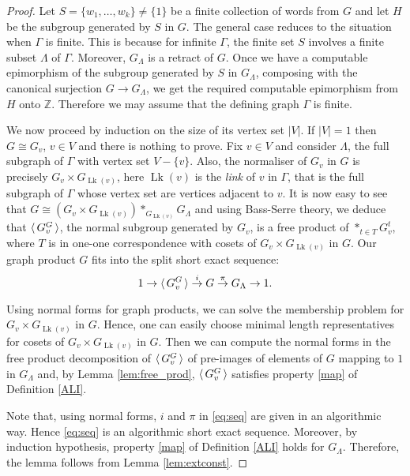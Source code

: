 \documentclass[12pt, a4paper]{amsart}
\theoremstyle{remark}
\theoremstyle{definition}
\begin{document}
\begin{proof} Let $S= \{w_1,\ldots,w_k\} \neq \{1\}$ be a finite collection of words from $G$ and let $H$ be the subgroup generated by $S$ in $G$. The general case reduces to the situation when $\Gamma$ is finite. This is because for infinite $\Gamma$, the finite set $S$ involves a finite subset $\Lambda$ of $\Gamma$. Moreover, $G_\Lambda $ is a retract of $G$. Once we have a computable epimorphism of the subgroup generated by $S$ in $G_\Lambda$, composing with the canonical surjection $G\rightarrow G_\Lambda$, we get the required computable epimorphism from $H$ onto ${\mathbb{Z}}$. Therefore we may assume that the defining graph $\Gamma$ is finite. 

We now proceed by induction on the size of its vertex set $|V|$.  If $|V|=1$ then $G \cong G_v$, $v\in V$ and there is nothing to prove. Fix $v \in V$ and consider $\Lambda$, the full subgraph of $\Gamma$ with vertex set $V - \{v\}$. Also, the normaliser of $G_v$ in $G$ is precisely $G_v \times G_{\operatorname{Lk}(v)}$, here $\operatorname{Lk}(v)$ is the {\it link} of $v$ in $\Gamma$, that is the full subgraph of $\Gamma$ whose vertex set are vertices adjacent to $v$. It is now easy to see that $G \cong (G_v \times G_{\operatorname{Lk}(v)} )*_{G_{\operatorname{Lk}(v)}}  G_\Lambda$ and using Bass-Serre theory, we deduce that ${\langle\mkern3mu{G_v^G}\mkern3mu\rangle}$, the normal subgroup generated by $G_v$, is a free product of $*_{t\in T}G_v^t$, where $T$ is in one-one correspondence with cosets of $G_v\times G_{\operatorname{Lk}(v)}$ in $G$. Our graph product $G$ fits into the split short exact sequence: 
\begin{equation}\label{eq:seq}1 \rightarrow {\langle\mkern3mu{ G_v^{G}}\mkern3mu\rangle}  \stackrel{i}{\rightarrow}G \stackrel{\pi}{\rightarrow} G_\Lambda \rightarrow 1.\end{equation}

Using normal forms for graph products, we can solve the membership problem for $G_v\times G_{\operatorname{Lk}(v)}$ in $G$. Hence, one can easily choose minimal length representatives for cosets of $G_v\times G_{\operatorname{Lk}(v)}$ in $G$. Then we can compute the normal forms in the free product decomposition of ${\langle\mkern3mu{G_v^G}\mkern3mu\rangle}$ of pre-images of elements of $G$ mapping to $1$ in $G_\Lambda$ and,  by Lemma \ref{lem:free_prod}, ${\langle\mkern3mu{ G_v^{G}}\mkern3mu\rangle}$ satisfies property \eqref{map} of Definition \ref{ALI}. 

Note that, using normal forms, $i$ and $\pi$ in \eqref{eq:seq} are given in an algorithmic way. Hence \eqref{eq:seq} is an algorithmic short exact sequence. Moreover, by induction hypothesis, property \eqref{map} of Definition \ref{ALI} holds for  $G_\Lambda$. Therefore, the lemma follows from  Lemma \ref{lem:extconst}.  
\end{proof}
\end{document}
